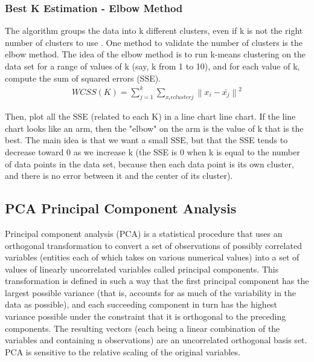 \subsubsection{Best K Estimation - Elbow Method}
The algorithm groups the data into k different clusters, even if k is not the right number of clusters to use \cite{website:elbow}. One method to validate the number of clusters is the elbow method. The idea of the elbow method is to run k-means clustering on the data set for a range of values of k (say, k from 1 to 10), and for each value of k, compute the sum of squared errors (SSE).
\begin{align}
     WCSS(K) = \sum_{j=1}^{k}  \sum_{x_i \epsilon clusterj}\left \| x_i-\bar{x_j} \right \|^{2}
\end{align}

Then, plot all the SSE (related to each K) in a line chart line chart. If the line chart looks like an arm, then the "elbow" on the arm is the value of k that is the best.
The main idea is that we want a small SSE, but that the SSE tends to decrease toward 0 as we increase k (the SSE is 0 when k is equal to the number of data points in the data set, because then each data point is its own cluster, and there is no error between it and the center of its cluster).


\subsection{PCA \- Principal Component Analysis}
Principal component analysis (PCA) is a statistical procedure that uses an orthogonal transformation to convert a set of observations of possibly correlated variables (entities each of which takes on various numerical values) into a set of values of linearly uncorrelated variables called principal components. This transformation is defined in such a way that the first principal component has the largest possible variance (that is, accounts for as much of the variability in the data as possible), and each succeeding component in turn has the highest variance possible under the constraint that it is orthogonal to the preceding components. The resulting vectors (each being a linear combination of the variables and containing n observations) are an uncorrelated orthogonal basis set. PCA is sensitive to the relative scaling of the original variables.